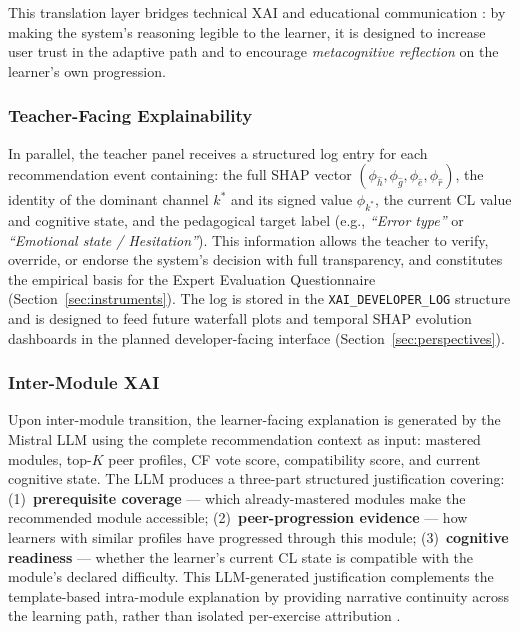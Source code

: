 \documentclass[ASNA,twocolumn]{USG} %
\begin{document}
This translation layer bridges technical XAI and educational
communication \cite{Govea2024}: by making the system's reasoning
legible to the learner, it is designed to increase user trust in
the adaptive path and to encourage \emph{metacognitive reflection}
on the learner's own progression.

\subsubsection{Teacher-Facing Explainability}

In parallel, the teacher panel receives a structured log entry for
each recommendation event containing: the full SHAP vector
$(\phi_{\hat{h}}, \phi_{\hat{g}}, \phi_{\hat{e}}, \phi_{\hat{r}})$,
the identity of the dominant channel $k^*$ and its signed value
$\phi_{k^*}$, the current CL value and cognitive state, and the
pedagogical target label (e.g., \emph{``Error type''} or
\emph{``Emotional state / Hesitation''}).
This information allows the teacher to verify, override, or endorse
the system's decision with full transparency, and constitutes the
empirical basis for the Expert Evaluation Questionnaire
(Section~\ref{sec:instruments}).
The log is stored in the \texttt{XAI\_DEVELOPER\_LOG} structure and
is designed to feed future waterfall plots and temporal SHAP
evolution dashboards in the planned developer-facing interface
(Section~\ref{sec:perspectives}).

\subsubsection{Inter-Module XAI}

Upon inter-module transition, the learner-facing explanation is
generated by the Mistral LLM using the complete recommendation
context as input: mastered modules, top-$K$ peer profiles, CF vote
score, compatibility score, and current cognitive state.
The LLM produces a three-part structured justification covering:
(1)~\textbf{prerequisite coverage} --- which already-mastered modules
make the recommended module accessible;
(2)~\textbf{peer-progression evidence} --- how learners with similar
profiles have progressed through this module;
(3)~\textbf{cognitive readiness} --- whether the learner's current
CL state is compatible with the module's declared difficulty.
This LLM-generated justification complements the template-based
intra-module explanation by providing narrative continuity across
the learning path, rather than isolated per-exercise attribution
\cite{Said2024}.
\end{document}
